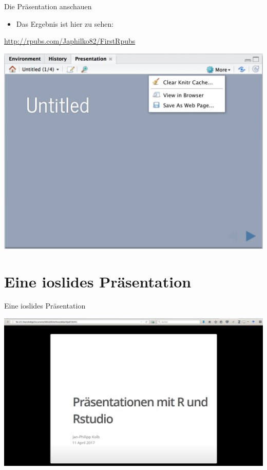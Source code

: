 \documentclass[ignorenonframetext,]{beamer}
\providecommand{\tightlist}{%
\setlength{\itemsep}{0pt}\setlength{\parskip}{0pt}}
\begin{document}
\begin{frame}{Die Präsentation anschauen}

\begin{itemize}
\tightlist
\item
  Das Ergebnis ist hier zu sehen:
\end{itemize}

\url{http://rpubs.com/Japhilko82/FirstRpubs}

\includegraphics{./tex2pdf.956/939ee613f01c6e79e04ac4b99515154375f2cfb6.png}

\end{frame}

\section{Eine ioslides Präsentation}\label{eine-ioslides-prasentation}

\begin{frame}{Eine ioslides Präsentation}

\includegraphics{./tex2pdf.956/0c27bd4ba04033cf53b90e4da01e03d9d37c70c9.png}

\end{frame}
\end{document}
